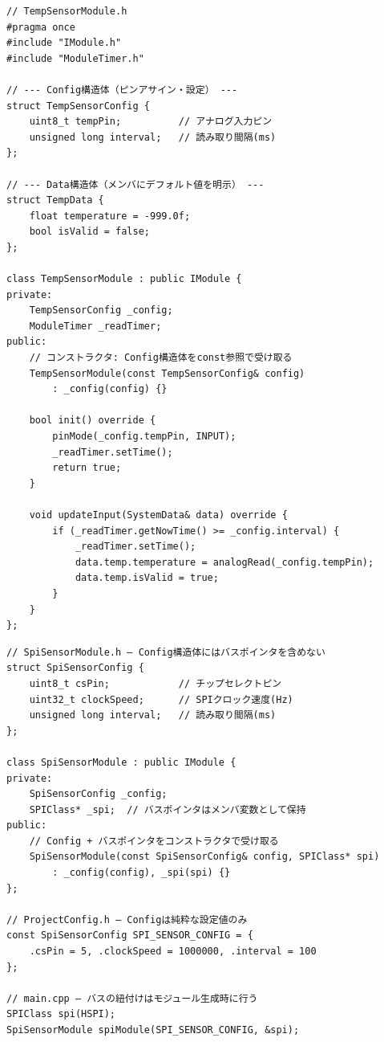 \begin{lstlisting}[style=cppstyle, caption={Config構造体の定義と使用例}]
// TempSensorModule.h
#pragma once
#include "IModule.h"
#include "ModuleTimer.h"

// --- Config構造体（ピンアサイン・設定） ---
struct TempSensorConfig {
    uint8_t tempPin;          // アナログ入力ピン
    unsigned long interval;   // 読み取り間隔(ms)
};

// --- Data構造体（メンバにデフォルト値を明示） ---
struct TempData {
    float temperature = -999.0f;
    bool isValid = false;
};

class TempSensorModule : public IModule {
private:
    TempSensorConfig _config;
    ModuleTimer _readTimer;
public:
    // コンストラクタ: Config構造体をconst参照で受け取る
    TempSensorModule(const TempSensorConfig& config)
        : _config(config) {}

    bool init() override {
        pinMode(_config.tempPin, INPUT);
        _readTimer.setTime();
        return true;
    }

    void updateInput(SystemData& data) override {
        if (_readTimer.getNowTime() >= _config.interval) {
            _readTimer.setTime();
            data.temp.temperature = analogRead(_config.tempPin);
            data.temp.isValid = true;
        }
    }
};
\end{lstlisting}

\begin{lstlisting}[style=cppstyle, caption={通信バスを使用するモジュールのConfig構造体とコンストラクタ例}]
// SpiSensorModule.h — Config構造体にはバスポインタを含めない
struct SpiSensorConfig {
    uint8_t csPin;            // チップセレクトピン
    uint32_t clockSpeed;      // SPIクロック速度(Hz)
    unsigned long interval;   // 読み取り間隔(ms)
};

class SpiSensorModule : public IModule {
private:
    SpiSensorConfig _config;
    SPIClass* _spi;  // バスポインタはメンバ変数として保持
public:
    // Config + バスポインタをコンストラクタで受け取る
    SpiSensorModule(const SpiSensorConfig& config, SPIClass* spi)
        : _config(config), _spi(spi) {}
};

// ProjectConfig.h — Configは純粋な設定値のみ
const SpiSensorConfig SPI_SENSOR_CONFIG = {
    .csPin = 5, .clockSpeed = 1000000, .interval = 100
};

// main.cpp — バスの紐付けはモジュール生成時に行う
SPIClass spi(HSPI);
SpiSensorModule spiModule(SPI_SENSOR_CONFIG, &spi);
\end{lstlisting}

